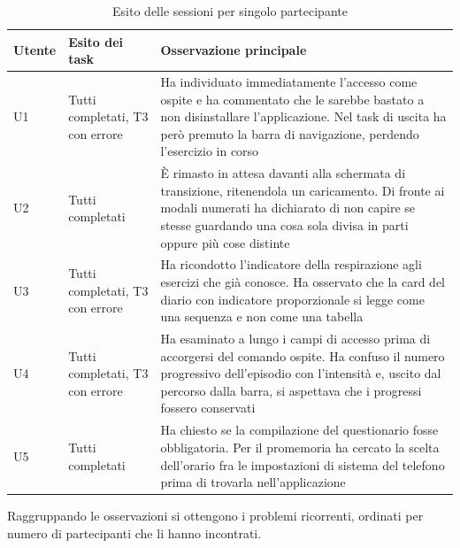 \begin{table}[htbp]
    \centering
    \small
    \renewcommand{\arraystretch}{1.3}
    \begin{tabularx}{\textwidth}{L{1.6cm} L{3.1cm} X}
        \toprule
        \textbf{Utente} & \textbf{Esito dei task} & \textbf{Osservazione principale} \\
        \midrule
        U1 & Tutti completati, T3 con errore & Ha individuato immediatamente l'accesso come ospite e ha commentato che le sarebbe bastato a non disinstallare l'applicazione. Nel task di uscita ha però premuto la barra di navigazione, perdendo l'esercizio in corso \\
        U2 & Tutti completati & È rimasto in attesa davanti alla schermata di transizione, ritenendola un caricamento. Di fronte ai modali numerati ha dichiarato di non capire se stesse guardando una cosa sola divisa in parti oppure più cose distinte \\
        U3 & Tutti completati, T3 con errore & Ha ricondotto l'indicatore della respirazione agli esercizi che già conosce. Ha osservato che la card del diario con indicatore proporzionale si legge come una sequenza e non come una tabella \\
        U4 & Tutti completati, T3 con errore & Ha esaminato a lungo i campi di accesso prima di accorgersi del comando ospite. Ha confuso il numero progressivo dell'episodio con l'intensità e, uscito dal percorso dalla barra, si aspettava che i progressi fossero conservati \\
        U5 & Tutti completati & Ha chiesto se la compilazione del questionario fosse obbligatoria. Per il promemoria ha cercato la scelta dell'orario fra le impostazioni di sistema del telefono prima di trovarla nell'applicazione \\
        \bottomrule
    \end{tabularx}
    \caption{Esito delle sessioni per singolo partecipante}
    \label{tab:esiti}
\end{table}

Raggruppando le osservazioni si ottengono i problemi ricorrenti, ordinati per numero di partecipanti che li hanno incontrati.


